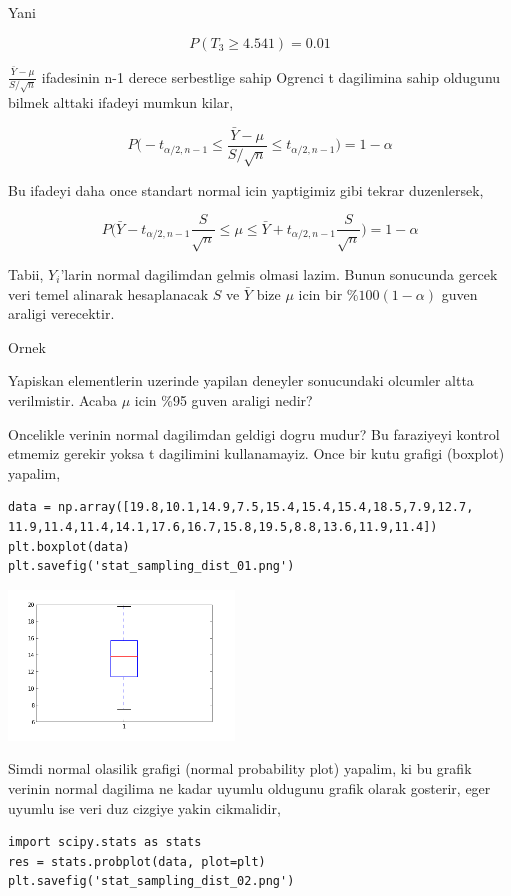 \documentclass[12pt,fleqn]{article}\usepackage{../common}
\begin{document}
Yani

$$ P(T_3 \ge 4.541) = 0.01 $$

$\frac{\bar{Y}-\mu}{S/\sqrt{n}}$ ifadesinin n-1 derece serbestlige sahip Ogrenci t dagilimina sahip 
oldugunu bilmek alttaki ifadeyi mumkun kilar, 

$$ P \bigg(
-t_{\alpha/2,n-1} \le
\frac{\bar{Y}-\mu}{S/\sqrt{n}} \le 
t_{\alpha/2,n-1}
\bigg) = 1-\alpha
 $$

Bu ifadeyi daha once standart normal icin yaptigimiz gibi tekrar
duzenlersek,

$$ P \bigg(
\bar{Y}-t_{\alpha/2,n-1}\frac{S}{\sqrt{n}} \le
\mu \le 
\bar{Y}+t_{\alpha/2,n-1}\frac{S}{\sqrt{n}}
\bigg) = 1-\alpha
$$

Tabii, $Y_i$'larin normal dagilimdan gelmis olmasi lazim. Bunun sonucunda
gercek veri temel alinarak hesaplanacak $S$ ve $\bar{Y}$ bize $\mu$ icin
bir $\%100(1-\alpha)$ guven araligi verecektir. 

Ornek

Yapiskan elementlerin uzerinde yapilan deneyler sonucundaki olcumler altta
verilmistir. Acaba $\mu$ icin \%95 guven araligi nedir?

Oncelikle verinin normal dagilimdan geldigi dogru mudur? Bu faraziyeyi
kontrol etmemiz gerekir yoksa t dagilimini kullanamayiz. Once bir kutu
grafigi (boxplot) yapalim,

\begin{verbatim}
data = np.array([19.8,10.1,14.9,7.5,15.4,15.4,15.4,18.5,7.9,12.7,
11.9,11.4,11.4,14.1,17.6,16.7,15.8,19.5,8.8,13.6,11.9,11.4])
plt.boxplot(data)
plt.savefig('stat_sampling_dist_01.png')
\end{verbatim}

\includegraphics[height=4cm]{stat_sampling_dist_01.png}

Simdi normal olasilik grafigi (normal probability plot) yapalim, ki bu
grafik verinin normal dagilima ne kadar uyumlu oldugunu grafik olarak
gosterir, eger uyumlu ise veri duz cizgiye yakin cikmalidir,

\begin{verbatim}
import scipy.stats as stats
res = stats.probplot(data, plot=plt)
plt.savefig('stat_sampling_dist_02.png')
\end{verbatim}
\end{document}
